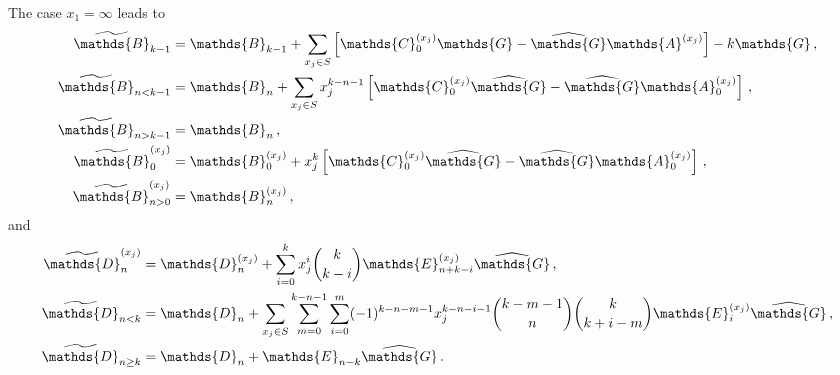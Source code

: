 \documentclass[12pt]{article}
\numberwithin{equation}{section}
\numberwithin{figure}{section}
\newcommand{\A}{\mathds{A}}
\newcommand{\B}{\mathds{B}}
\newcommand{\C}{\mathds{C}}
\newcommand{\D}{\mathds{D}}
\newcommand{\E}{\mathds{E}}
\newcommand{\G}{\mathds{G}}
\begin{document}
      The case $x_1=\infty$ leads to
      \begin{align*}
        \widetilde\B_{k-1} &=
          \B_{k-1}
          +
          \sum\limits_{x_j\in S} 
          \left[\C_0^{(x_j)}\G - \widehat\G\A^{(x_j)}\right] 
          -
          k\G\,,
          \\
        \widetilde\B_{n<k-1} &=
          \B_n
          +
          \sum\limits_{x_j\in S} 
          x_j^{k-n-1}
          \left[\C_0^{(x_j)}\widehat\G - \widehat\G\A_0^{(x_j)}\right] \,,
          \\
        \widetilde\B_{n>k-1} &=
          \B_n \,,
          \\
        \widetilde\B^{(x_j)}_0 &=
          \B^{(x_j)}_0
          +
          x_j^k
          \left[\C_0^{(x_j)}\widehat\G - \widehat\G\A_0^{(x_j)}\right] \,,
          \\
        \widetilde\B^{(x_j)}_{n>0} &=
          \B^{(x_j)}_n \,,
      \end{align*}
      and
      \begin{align*}
        \widetilde\D^{(x_j)}_n &=
          \D^{(x_j)}_n
          +
          \sum\limits_{i=0}^k 
          x_j^i\binom{k}{k-i}
          \E^{(x_j)}_{n+k-i}\widehat\G \,,
          \\
        \widetilde\D_{n<k} &=
          \D_n
          +
          \sum\limits_{x_j\in S} 
          \sum\limits_{m=0}^{k-n-1}
          \sum\limits_{i=0}^{m}
          (-1)^{k-n-m-1}
          x_j^{k-n-i-1}
          \binom{k-m-1}{n}
          \binom{k}{k+i-m} 
          \E^{(x_j)}_i\widehat\G \,,
          \\
        \widetilde\D_{n\geq k} &=
          \D_n
          +
          \E_{n-k}\widehat\G \,.
      \end{align*}
\end{document}
